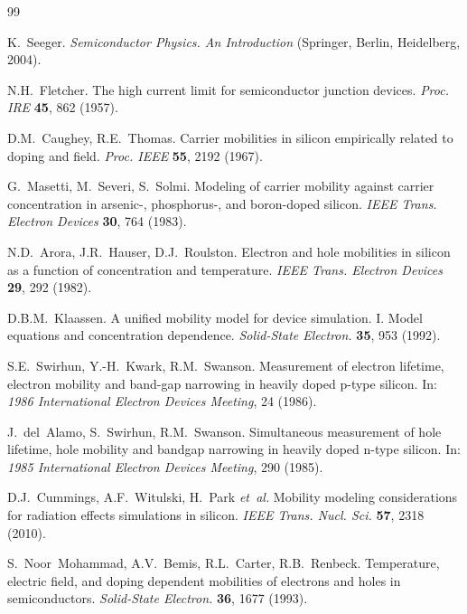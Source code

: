 \documentclass[fleqn,twoside,twocolumn,nofootinbib,showkeys]{revtex4} %
\begin{document}
%

\begin{thebibliography}{99}                                                                                                %


K.~Seeger. \textit{Semiconductor Physics. An Introduction}
(Springer, Berlin, Heidelberg, 2004).

N.H.~Fletcher. The high current limit for semiconductor junction devices.
\textit{Proc. IRE} \textbf{45}, 862 (1957).

D.M.~Caughey, R.E.~Thomas. Carrier mobilities in silicon empirically related to doping and field.
\textit{Proc. IEEE} \textbf{55}, 2192 (1967).

G.~Masetti, M.~Severi, S.~Solmi. Modeling of carrier mobility against carrier concentration in arsenic-, phosphorus-, and boron-doped silicon.
\textit{IEEE Trans. Electron Devices} \textbf{30}, 764 (1983).

N.D.~Arora, J.R.~Hauser, D.J.~Roulston. Electron and hole mobilities in silicon as a function of concentration and temperature.
\textit{IEEE Trans. Electron Devices} \textbf{29}, 292 (1982).

D.B.M.~Klaassen. A unified mobility model for device simulation. I. Model equations and concentration dependence.
\textit{Solid-State Electron.} \textbf{35}, 953 (1992).

S.E.~Swirhun, Y.-H.~Kwark, R.M.~Swanson. Measurement of electron lifetime, electron mobility and band-gap narrowing in heavily doped p-type silicon.
In: \textit{1986 International Electron Devices Meeting}, 24 (1986).

J.~del~Alamo, S.~Swirhun, R.M.~Swanson. Simultaneous measurement of hole lifetime, hole mobility and bandgap narrowing in heavily doped n-type silicon.
In: \textit{1985 International Electron Devices Meeting}, 290 (1985).

D.J.~Cummings, A.F.~Witulski, H.~Park {\it et~al.}
Mobility modeling considerations for radiation effects simulations in silicon.
\textit{IEEE Trans. Nucl. Sci.} \textbf{57}, 2318 (2010).

S.~Noor~Mohammad, A.V.~Bemis, R.L.~Carter, R.B.~Renbeck.
Temperature, electric field, and doping dependent mobilities of electrons and holes in semiconductors.
\textit{Solid-State Electron.} \textbf{36}, 1677 (1993).


\end{thebibliography}
\end{document}
